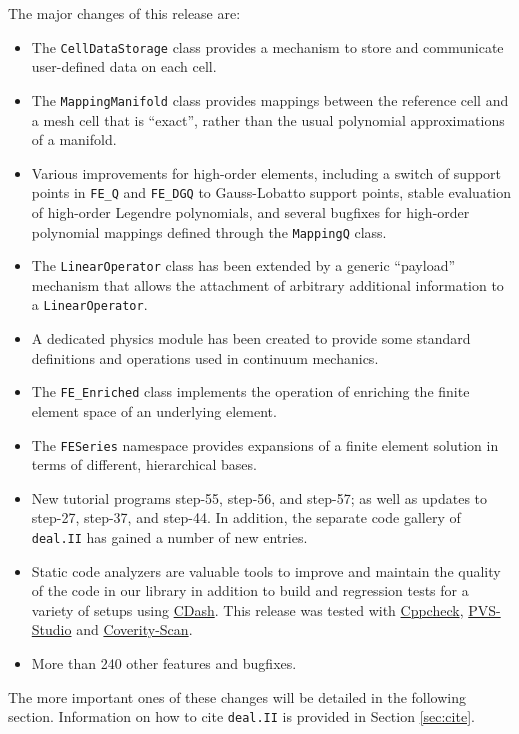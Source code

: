 \documentclass{ansarticle-preprint}
\newcommand{\specialword}[1]{\texttt{#1}}
\newcommand{\dealii}{{\specialword{deal.II}}}
\begin{document}
The major changes of this release are:
\begin{itemize}
\item The \texttt{CellDataStorage} class provides a mechanism to store
  and communicate user-defined data on each cell.

\item The \texttt{MappingManifold} class provides mappings between the
  reference cell and a mesh cell that is ``exact'', rather than the
  usual polynomial approximations of a manifold.

\item Various improvements for high-order elements, including a switch of
  support points in \texttt{FE\_Q} and \texttt{FE\_DGQ} to Gauss-Lobatto
  support points, stable evaluation of high-order Legendre polynomials, and
  several bugfixes for high-order polynomial mappings defined through the
  \texttt{MappingQ} class.

\item The \texttt{LinearOperator} class has been extended by a generic
  ``payload'' mechanism that allows the attachment of arbitrary additional
  information to a \texttt{LinearOperator}.

\item A dedicated physics module has been created to provide some standard
  definitions and operations used in continuum mechanics.

\item The \texttt{FE\_Enriched} class implements the operation of
  enriching the finite element space of an underlying element.

\item The \texttt{FESeries} namespace provides expansions of a finite
  element solution in terms of different, hierarchical bases.

\item New tutorial programs step-55, step-56, and step-57; as well as
  updates to step-27, step-37, and step-44. In addition, the separate code
  gallery of \dealii{} has gained a number of new entries.


\item Static code analyzers are valuable tools to improve
  and maintain the quality of the code in our library in addition to build and
  regression tests for a variety of setups using
  \href{https://cdash.kyomu.43-1.org/index.php?project=deal.II}{CDash}.
  This release was tested with
  \href{http://cppcheck.sourceforge.net/}{Cppcheck},
  \href{https://www.viva64.com/en/pvs-studio/}{PVS-Studio} and
  \href{https://scan.coverity.com/}{Coverity-Scan}.

  \item More than 240 other features and bugfixes.
\end{itemize}
The more important ones of these changes will be detailed in the
following section.  Information on how to cite \dealii{} is provided
in Section \ref{sec:cite}.
\end{document}
